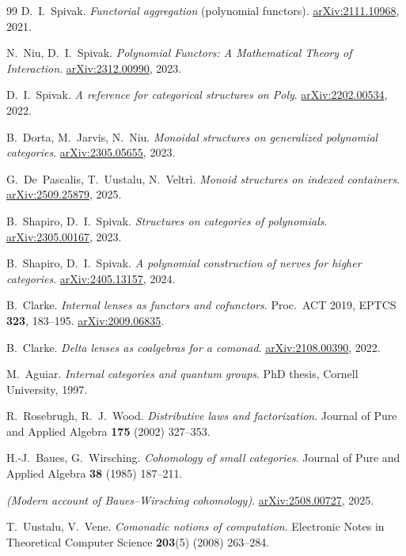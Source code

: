 \documentclass[11pt,a4paper]{book}
\theoremstyle{plain}
\theoremstyle{definition}
\theoremstyle{remark}
\begin{document}
\begin{thebibliography}{99}
 D.~I.~Spivak.
\emph{Functorial aggregation} (polynomial functors).
\href{https://arxiv.org/abs/2111.10968}{arXiv:2111.10968}, 2021.

 N.~Niu, D.~I.~Spivak.
\emph{Polynomial Functors: A Mathematical Theory of Interaction}.
\href{https://arxiv.org/abs/2312.00990}{arXiv:2312.00990}, 2023.

 D.~I.~Spivak.
\emph{A reference for categorical structures on \textup{Poly}}.
\href{https://arxiv.org/abs/2202.00534}{arXiv:2202.00534}, 2022.

 B.~Dorta, M.~Jarvis, N.~Niu.
\emph{Monoidal structures on generalized polynomial categories}.
\href{https://arxiv.org/abs/2305.05655}{arXiv:2305.05655}, 2023.

 G.~De~Pascalis, T.~Uustalu, N.~Veltr\`i.
\emph{Monoid structures on indexed containers}.
\href{https://arxiv.org/abs/2509.25879}{arXiv:2509.25879}, 2025.

 B.~Shapiro, D.~I.~Spivak.
\emph{Structures on categories of polynomials}.
\href{https://arxiv.org/abs/2305.00167}{arXiv:2305.00167}, 2023.

 B.~Shapiro, D.~I.~Spivak.
\emph{A polynomial construction of nerves for higher categories}.
\href{https://arxiv.org/abs/2405.13157}{arXiv:2405.13157}, 2024.

 B.~Clarke.
\emph{Internal lenses as functors and cofunctors}.
Proc.\ ACT 2019, EPTCS \textbf{323}, 183--195.
\href{https://arxiv.org/abs/2009.06835}{arXiv:2009.06835}.

 B.~Clarke.
\emph{Delta lenses as coalgebras for a comonad}.
\href{https://arxiv.org/abs/2108.00390}{arXiv:2108.00390}, 2022.

 M.~Aguiar.
\emph{Internal categories and quantum groups}.
PhD thesis, Cornell University, 1997.

 R.~Rosebrugh, R.~J.~Wood.
\emph{Distributive laws and factorization}.
Journal of Pure and Applied Algebra \textbf{175} (2002) 327--353.

 H.-J.~Baues, G.~Wirsching.
\emph{Cohomology of small categories}.
Journal of Pure and Applied Algebra \textbf{38} (1985) 187--211.

 \emph{(Modern account of Baues--Wirsching cohomology)}.
\href{https://arxiv.org/abs/2508.00727}{arXiv:2508.00727}, 2025.

 T.~Uustalu, V.~Vene.
\emph{Comonadic notions of computation}.
Electronic Notes in Theoretical Computer Science \textbf{203}(5) (2008) 263--284.


\end{thebibliography}
\end{document}
